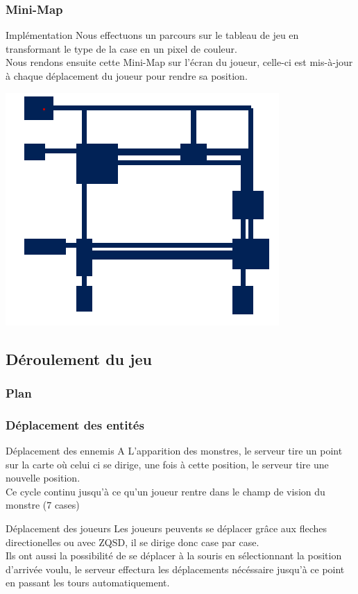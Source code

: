 \documentclass[french]{beamer}
\begin{document}
\begin{frame}
\frametitle{Mini-Map}
   
\begin{block}{Implémentation}
Nous effectuons un parcours sur le tableau de jeu en transformant le type de la case en un pixel de couleur.\\
Nous rendons ensuite cette Mini-Map sur l'écran du joueur, celle-ci est mis-à-jour à chaque déplacement du joueur pour rendre sa position.
\end{block}

\center
\includegraphics[scale=0.5]{Mini-Map}

\end{frame}

\subsection{Déroulement du jeu}

\begin{frame}
\frametitle{Plan}
\end{frame}

\begin{frame}
\frametitle{Déplacement des entités}
\begin{block}{Déplacement des ennemis}
A L'apparition des monstres, le serveur tire un point sur la carte où celui ci se dirige, une fois à cette position, le serveur tire une nouvelle position.\\ 
Ce cycle continu jusqu'à ce qu'un joueur rentre dans le champ de vision du monstre (7 cases)
\end{block}
\begin{block}{Déplacement des joueurs}
Les joueurs peuvents se déplacer grâce aux fleches directionelles ou avec ZQSD, il se dirige donc case par case.\\
Ils ont aussi la possibilité de se déplacer à la souris en sélectionnant la position d'arrivée voulu, le serveur effectura les déplacements nécéssaire jusqu'à ce point en passant les tours automatiquement.
\end{block}
\end{frame}
\end{document}
